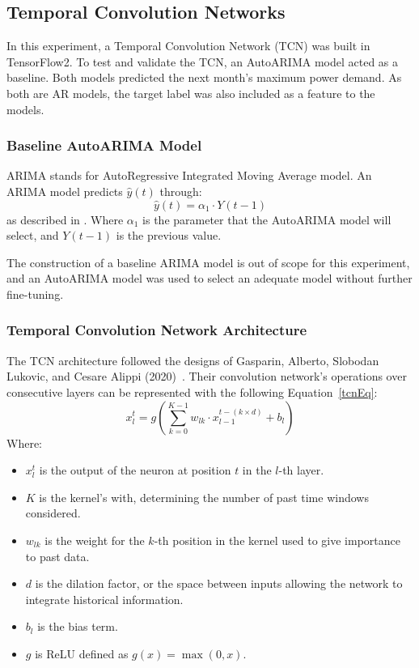 \documentclass{ieeeaccess}
\begin{document}
\subsection{Temporal Convolution Networks} \label{TCNarch}

In this experiment, a Temporal Convolution Network (TCN) was built in TensorFlow2. To test and validate the TCN, an AutoARIMA model acted as a baseline. Both models predicted the next month's maximum power demand. As both are AR models, the target label was also included as a feature to the models.

\subsubsection{Baseline AutoARIMA Model}

ARIMA stands for AutoRegressive Integrated Moving Average model. An ARIMA model predicts \( \hat{y}(t) \) through:
\begin{equation}
\hat{y}(t) = \alpha_1 \cdot Y(t-1)
\label{eq:arima}
\end{equation}
as described in \cite{Zhang2018}. Where $\alpha_1$ is the parameter that the AutoARIMA model will select, and $Y(t-1)$ is the previous value.

The construction of a baseline ARIMA model is out of scope for this experiment, and an AutoARIMA model was used to select an adequate model without further fine-tuning.

\subsubsection{Temporal Convolution Network Architecture}

The TCN architecture followed the designs of Gasparin, Alberto, Slobodan Lukovic, and Cesare Alippi (2020)~\cite{Gasparin2022}. Their convolution network's operations over consecutive layers can be represented with the following Equation~\ref{tcnEq}:
\begin{equation} \label{tcnEq}
x_{l}^{t} = g\left(\sum_{k=0}^{K-1} w_{lk} \cdot x_{l-1}^{t-(k \times d)} + b_l\right)
\end{equation}
Where:
\begin{itemize}
    \item \( x_{l}^{t} \) is the output of the neuron at position \( t \) in the \( l \)-th layer.
    \item \( K \) is the kernel's with, determining the number of past time windows considered.
    \item \( w_{lk} \) is the weight for the \( k \)-th position in the kernel used to give importance to past data.
    \item \( d \) is the dilation factor, or the space between inputs allowing the network to integrate historical information.
    \item \( b_l \) is the bias term.
    \item \( g \) is ReLU defined as \( g(x) = \max(0, x) \).
\end{itemize}
\end{document}
